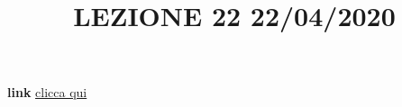 \newline
\newline
\title{LEZIONE 22 22/04/2020}\newline
\textbf{link} \href{https://web.microsoftstream.com/video/8131759e-6eeb-4e60-8635-05c0853b8df3?list=user&userId=faa91214-a6f5-40d7-8875-253fd49b8ce1}{clicca qui}